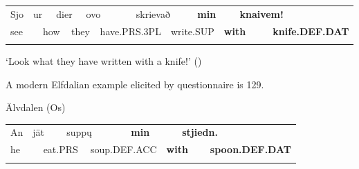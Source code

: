 \begin{tabular}{llllllllllllll}
\lsptoprule
Sjo & \multicolumn{2}{l}{ur

} & \multicolumn{2}{l}{dier

} & \multicolumn{2}{l}{ovo

} & \multicolumn{2}{l}{skrievað

} & \multicolumn{2}{l}{{\bfseries min}

} & \multicolumn{2}{l}{{\bfseries knaivem!}

} & \\
\multicolumn{2}{l}{see

} & \multicolumn{2}{l}{how

} & \multicolumn{2}{l}{they

} & \multicolumn{2}{l}{have.PRS.3PL

} & \multicolumn{2}{l}{write.SUP

} & \multicolumn{2}{l}{{\bfseries with}

} & \multicolumn{2}{l}{{\bfseries knife.DEF.DAT}

}\\
\lspbottomrule
\end{tabular}

\begin{styleTranslation}
‘Look what they have written with a knife!’ (\citet[125]{Levander1909})

\end{styleTranslation}

A modern Elfdalian example elicited by questionnaire is 129.

\begin{listWWNumileveli}
\item {}

\begin{styleExample}
\label{bkm:Ref224103303}Älvdalen (Os)

\end{styleExample}

\end{listWWNumileveli}

\begin{tabular}{llllllllll}
\lsptoprule
An & \multicolumn{2}{l}{jät

} & \multicolumn{2}{l}{supp\k{u}

} & \multicolumn{2}{l}{{\bfseries min}

} & \multicolumn{2}{l}{{\bfseries stjiedn.}

} & \\
\multicolumn{2}{l}{he

} & \multicolumn{2}{l}{eat.PRS

} & \multicolumn{2}{l}{soup.DEF.ACC

} & \multicolumn{2}{l}{{\bfseries with}

} & \multicolumn{2}{l}{{\bfseries spoon.DEF.DAT}

}\\
\lspbottomrule
\end{tabular}

